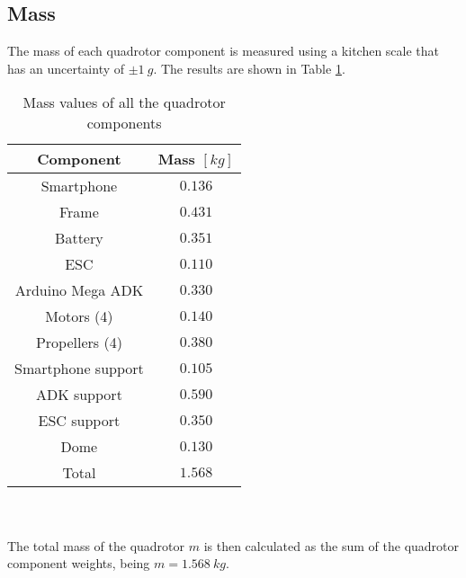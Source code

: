 \subsection{Mass}
The mass of each quadrotor component is measured using a kitchen scale that has an uncertainty of $\pm 1\ g$. The results are shown in Table \ref{tb:mass}.
\begin{table}[h]
\small
\begin{center}
\caption{Mass values of all the quadrotor components}\label{tb:mass}
\begin{tabular}{c|c}\hline
\rule{0pt}{3ex} Component & Mass $[kg]$ \\\hline\hline
\rule{0pt}{3ex}Smartphone &  $0.136$ \\[0.7ex]
Frame &  $0.431$ \\[0.7ex]
Battery & $0.351$ \\[0.7ex]
ESC &  $0.110$ \\[0.7ex] 
Arduino Mega ADK &  $0.330$ \\[0.7ex]
Motors (4) & $0.140$ \\[0.7ex]
Propellers (4) &  $0.380$ \\[0.7ex]
Smartphone support &  $0.105$ \\[0.7ex]
ADK support &  $0.590$  \\[0.7ex]
ESC support &  $0.350$  \\[0.7ex]
Dome &  $0.130$ \\[0.7ex]\hline
\rule{0pt}{3ex} Total & $1.568$
\end{tabular}
\end{center}
\end{table}
\\\\The total mass of the quadrotor $m$ is then calculated as the sum of the quadrotor component weights, being $m = 1.568\ kg$.
